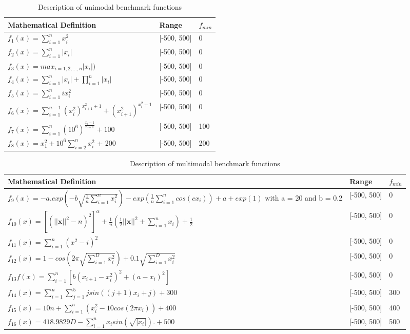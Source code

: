 \documentclass[a4paper,13pt,2p]{report}
\begin{document}
\begin{table}[!t]
\caption{Description of unimodal benchmark functions}
\label{tbl_uni_funcs}
\centering
\begin{tabular}{p{9cm} p{2cm} p{1cm}}
 \hline Mathematical Definition & Range & $f_{min}$  \\ 
 \hline
$f_1(x) = \sum_{i=1}^n x_i^2$ & [-500, 500] & 0 \\
$f_2(x) =  \sum_{i=1}^n |x_i|$ & [-500, 500] & 0 \\
$f_3(x) =  max_{i = 1, 2,...,n}|x_i|)$ & [-500, 500] & 0 \\
$f_4(x) =  \sum_{i=1}^n |x_i| + \prod_{i=1}^n |x_i|$  & [-500, 500] & 0 \\
$f_5(x) =  \sum_{i=1}^n ix_i^2$ & [-500, 500] & 0 \\
$f_6(x) =  \sum_{i=1}^{n-1} (x_i^2)^{x_{i+1}^2+1} + (x_{i+1}^2)^{x_{i}^2+1}$ & [-500, 500] & 0 \\
$f_7(x) =  \sum_{i=1}^n (10^6)^{\frac{x_i-1}{n-1}} + 100$ & [-500, 500] & 100 \\
$f_8(x) = x_1^2 + 10^6\sum_{i=2}^n x_i^2$ + 200 & [-500, 500] & 200 \\
 \hline
\end{tabular}
\end{table}

\begin{table}[!t]
\caption{Description of multimodal benchmark functions}
\label{tbl_multi_funcs}
\centering
\begin{tabular}{p{9cm} p{2cm} p{1cm}}
 \hline 
 Mathematical Definition & Range & $f_{min}$  \\ 
 \hline
$f_9(x) = -a.exp(-b\sqrt{\frac{1}{n}\sum_{i=1}^{n}x_i^2})-exp(\frac{1}{n}\sum_{i=1}^{n}cos(cx_i))+ a + exp(1)$ with a = 20 and b = 0.2 & [-500, 500] & 0 \\
$f_{10}(x) =\left[\left(||\textbf{x}||^2 - n\right)^2\right]^\alpha + \frac{1}{n}\left(\frac{1}{2}||\textbf{x}||^2+\sum_{i=1}^{n}x_i\right)+\frac{1}{2}$ & [-500, 500] & 0 \\
$f_{11}(x) =\sum_{i=1}^{n}(x^2-i)^2$ & [-500, 500] & 0 \\
$f_{12}(x)=1-cos(2\pi\sqrt{\sum_{i=1}^{D}x_i^2})+0.1\sqrt{\sum_{i=1}^{D}x_i^2}$ & [-500, 500] & 0 \\
$f_{13}f(x)=\sum_{i=1}^{n}[b (x_{i+1} - x_i^2)^ 2 + (a - x_i)^2]$ & [-500, 500] & 0 \\
$f_{14}(x) = \sum_{i=1}^{n}{\sum_{j=1}^5{j sin((j+1)x_i+j)} + 300}$ & [-500, 500] & 300 \\
$f_{15}(x)=10n + \sum_{i=1}^{n}(x_i^2 - 10cos(2\pi x_i)) + 400$ & [-500, 500] & 400 \\
$f_{16}(x) = 418.9829D -{\sum_{i=1}^{n} x_i sin(\sqrt{|x_i|})}. + 500$ & [-500, 500] & 500 \\
\hline
\end{tabular}
\end{table}
\end{document}
